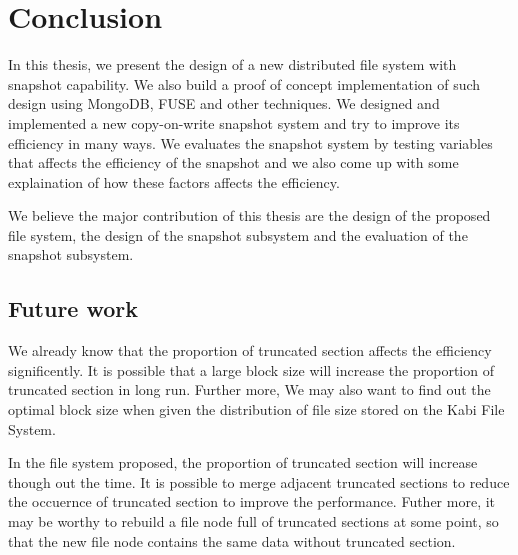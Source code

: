 \chapter{Conclusion}
\label{chap:conclusion}

    In this thesis, we present the design of a new distributed file system with snapshot capability. We also build a proof of concept implementation of such design using MongoDB, FUSE and other techniques. We designed and implemented a new copy-on-write snapshot system and try to improve its efficiency in many ways. We evaluates the snapshot system by testing variables that affects the efficiency of the snapshot and we also come up with some explaination of how these factors affects the efficiency.

    We believe the major contribution of this thesis are the design of the proposed file system, the design of the snapshot subsystem and the evaluation of the snapshot subsystem.

\section{Future work}

     We already know that the proportion of truncated section affects the efficiency significently. It is possible that a large block size will increase the proportion of truncated section in long run. Further more, We may also want to find out the optimal block size when given the distribution of file size stored on the Kabi File System.

     In the file system proposed, the proportion of truncated section will increase though out the time. It is possible to merge adjacent truncated sections to reduce the occuernce of truncated section to improve the performance. Futher more, it may be worthy to rebuild a file node full of truncated sections at some point, so that the new file node contains the same data without truncated section.
